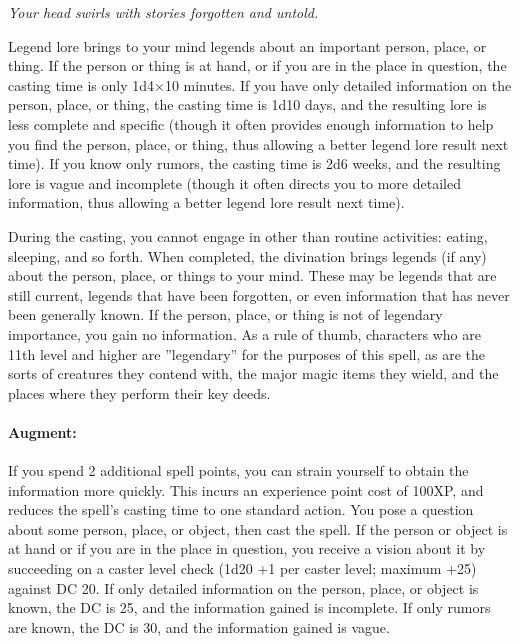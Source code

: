 \emph{Your head swirls with stories forgotten and untold.}

Legend lore brings to your mind legends about an important person, place, or thing.
If the person or thing is at hand, or if you are in the place in question, the casting time is only 1d4$\times$10 minutes.
If you have only detailed information on the person, place, or thing, the casting time is 1d10 days, 
and the resulting lore is less complete and specific 
(though it often provides enough information to help you find the person, place, or thing, thus allowing a better legend lore result next time). 
If you know only rumors, the casting time is 2d6 weeks, and the resulting lore is vague and incomplete 
(though it often directs you to more detailed information, thus allowing a better legend lore result next time).

During the casting, you cannot engage in other than routine activities: eating, sleeping, and so forth. 
When completed, the divination brings legends (if any) about the person, place, or things to your mind. 
These may be legends that are still current, legends that have been forgotten, or even information that has never been generally known.
If the person, place, or thing is not of legendary importance, you gain no information.
As a rule of thumb, characters who are 11th level and higher are ''legendary'' for the purposes of this spell,
as are the sorts of creatures they contend with, the major magic items they wield, and the places where they perform their key deeds. 

\paragraph{Augment:} If you spend 2 additional spell points, you can strain yourself to obtain the information more quickly.
This incurs an experience point cost of 100XP, and reduces the spell's casting time to one standard action.
You pose a question about some person, place, or object, then cast the spell. 
If the person or object is at hand or if you are in the place in question, 
you receive a vision about it by succeeding on a caster level check (1d20 +1 per caster level; maximum +25) against DC 20. 
If only detailed information on the person, place, or object is known, the DC is 25, and the information gained is incomplete. 
If only rumors are known, the DC is 30, and the information gained is vague.
